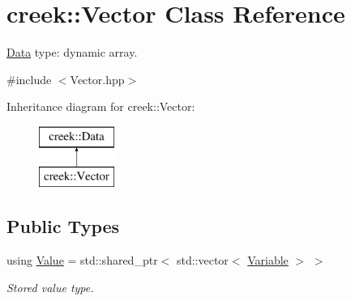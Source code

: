 \hypertarget{classcreek_1_1_vector}{}\section{creek\+:\+:Vector Class Reference}
\label{classcreek_1_1_vector}


\hyperlink{classcreek_1_1_data}{Data} type\+: dynamic array.  




{\ttfamily \#include $<$Vector.\+hpp$>$}

Inheritance diagram for creek\+:\+:Vector\+:\begin{figure}[H]
\begin{center}
\leavevmode
\includegraphics[height=2.000000cm]{classcreek_1_1_vector}
\end{center}
\end{figure}
\subsection*{Public Types}
\begin{DoxyCompactItemize}
\item 
using \hyperlink{classcreek_1_1_vector_a8e0b043540d45e1522d3601e599c2684}{Value} = std\+::shared\+\_\+ptr$<$ std\+::vector$<$ \hyperlink{classcreek_1_1_variable}{Variable} $>$ $>$\hypertarget{classcreek_1_1_vector_a8e0b043540d45e1522d3601e599c2684}{}\label{classcreek_1_1_vector_a8e0b043540d45e1522d3601e599c2684}

\begin{DoxyCompactList}\small\item\em Stored value type. \end{DoxyCompactList}\end{DoxyCompactItemize}
